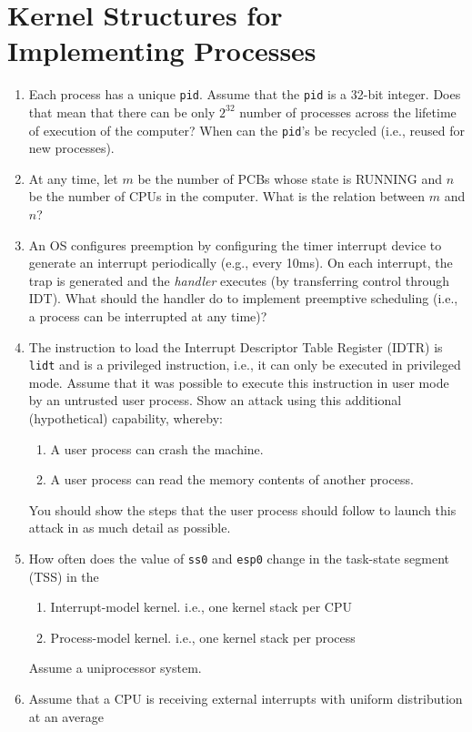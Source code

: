 \section{Kernel Structures for Implementing Processes}
\begin{enumerate}
\item Each process has a unique {\tt pid}. Assume that the {\tt pid} is a 32-bit integer.
Does that mean that there can be only $2^{32}$ number of processes across the lifetime
of execution of the computer? When can the {\tt pid}'s be recycled (i.e., reused for new
processes).
\item At any time, let $m$ be the number of PCBs whose state is RUNNING and $n$ be the
number of CPUs in the computer. What is the relation between $m$ and $n$?
\item An OS configures preemption by configuring the timer interrupt device to generate
an interrupt periodically (e.g., every 10ms). On each interrupt, the trap is generated
and the {\em handler} executes (by transferring control through IDT). What should the
handler do to implement preemptive scheduling (i.e., a process can be interrupted
at any time)?
\item The instruction to load the Interrupt Descriptor Table
Register (IDTR) is {\tt lidt} and is a privileged instruction, i.e., it can
only be executed in privileged mode. Assume that it was possible
to execute this instruction in user mode by an untrusted
user process. Show an attack using this additional (hypothetical)
capability, whereby:
\begin{enumerate}
\item A user process can crash the machine.
\item A user process can read the memory contents of another
process.
\end{enumerate}
You should show the steps that the user process should follow
to launch this attack in as much detail as possible.
\item How often does the value of {\tt ss0} and {\tt esp0} change in the
task-state segment (TSS) in the
\begin{enumerate}
\item Interrupt-model kernel. i.e., one kernel stack per CPU
\item Process-model kernel. i.e., one kernel stack per process
\end{enumerate}
Assume a uniprocessor system.
\item Assume that a CPU is receiving external
interrupts with uniform distribution at an average

\end{enumerate}
